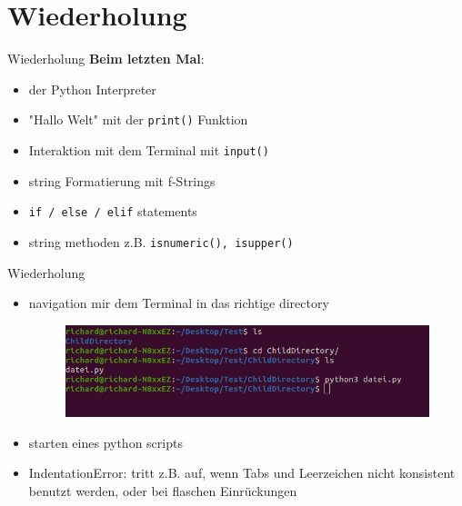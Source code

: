 \section{Wiederholung}
\begin{frame}{Wiederholung}
	\textbf{Beim letzten Mal}:
	\begin{itemize}
		
		
		\item
		der Python Interpreter
		\item
		"Hallo Welt" mit der \alert{\texttt{print()}} Funktion 
		\item Interaktion mit dem Terminal mit \alert{\texttt{input()}}
		\item
		string Formatierung mit f-Strings
		
		\item \alert{\texttt{if / else / elif}} statements
		\item string methoden z.B. \alert{\texttt{isnumeric(), isupper()}}
		
		
	\end{itemize}
\end{frame}
\begin{frame}{Wiederholung}
	\begin{itemize}
		\item navigation mir dem Terminal in das richtige directory
		\begin{figure}
			\includegraphics[width=\linewidth]{resources/02iteration/commandlinepython.png}
		\end{figure}
		
		\item
		starten eines python scripts
		
		\item
		IndentationError: tritt z.B. auf, wenn Tabs und Leerzeichen nicht konsistent benutzt werden, oder bei flaschen Einrückungen
		
		
	\end{itemize}
\end{frame}


